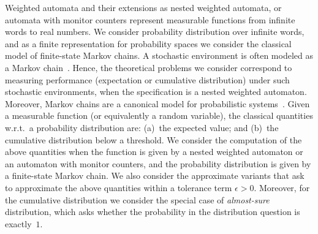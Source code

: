 \documentclass{lmcs}
\begin{document}
\smallskip{}
Weighted automata and their extensions as nested weighted automata, or automata
with monitor counters represent measurable functions from infinite words to
real numbers.
We consider probability distribution over infinite words, and as a finite
representation for probability spaces we consider the classical model of
finite-state Markov chains.
A stochastic environment is often modeled as a Markov chain~\cite{probabilisticMeasuriung}.
Hence, the theoretical problems we consider correspond to measuring performance (expectation or cumulative distribution) under such stochastic environments, when the specification is a nested weighted automaton.
Moreover, Markov chains are a canonical model for probabilistic systems~\cite{PRISM,BaierBook}.
Given a measurable function (or equivalently a random variable), the classical
quantities w.r.t.\ a probability distribution are: (a)~the expected value; and
(b)~the cumulative distribution below a threshold.
We consider the computation of the above quantities when the function is given
by a nested weighted automaton or an automaton with monitor counters, and the
probability distribution is given by a finite-state Markov chain.
We also consider the approximate variants that ask to approximate the above quantities
within a tolerance term $\epsilon>0$.
Moreover, for the cumulative distribution we consider the special case of
\emph{almost-sure} distribution, which asks whether the probability in the distribution question is exactly~$1$.
\end{document}
